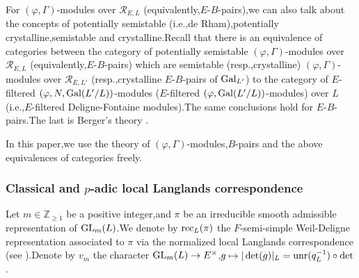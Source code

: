 \documentclass[SecEq,CM,GP]{degruyter-crelle} %
\theoremstyle{plain}
\newcommand{\gal}{{\rm Gal}}
\newcommand{\GLN}{{\rm GL}}
\newcommand{\rec}{{\rm rec}_L}
\newcommand{\unr}{{\rm unr}}
\newcommand{\BZ}{{\mathbb{Z}}}
\newcommand{\cR}{\mathcal R}
\begin{document}
For $(\varphi,\Gamma)$-modules over $\cR_{E,L}$ (equivalently,\;$E$-$B$-pairs),\;we can also talk about the concepts of potentially semistable (i.e.,de Rham),\;potentially crystalline,\;semistable and crystalline.\;Recall that there is an equivalence of categories between the category of potentially semistable $(\varphi,\Gamma)$-modules over $\cR_{E,L}$ (equivalently,\;$E$-$B$-pairs) which are semistable  (resp.,\;crystalline) $(\varphi,\Gamma)$-modules over $\cR_{E,L'}$ (resp.,\;crystalline $E$-$B$-pairs of $\gal_{L'}$) to the category of $E$-filtered $(\varphi,N,\gal(L'/L))$-modules ($E$-filtered $(\varphi,\gal(L'/L))$-modules) over $L$ (i.e.,\;$E$-filtered Deligne-Fontaine modules).\;The same conclusions hold for $E$-$B$-pairs.\;The last is Berger's theory \cite[Theorem A]{berger2008equations}.\;

In this paper,\;we use  the theory of  $(\varphi,\Gamma)$-modules,\;$B$-pairs and the above equivalences of categories freely.\;


\subsubsection*{Classical and $p$-adic local Langlands correspondence}
Let $m\in \BZ_{\geq 1}$ be a positive integer,\;and $\pi$ be an irreducible smooth admissible representation of $\GLN_m(L)$.\;We denote by $\rec(\pi)$ the $F$-semi-simple Weil-Deligne representation associated to $\pi$ via the normalized local Langlands correspondence (see \cite{scholze2013local}).\;Denote by $v_m$ the character $\GLN_m(L)\rightarrow E^\times$,\;$g\mapsto |\det(g)|_L=\unr(q_L^{-1})\circ\det$.\;
\end{document}
